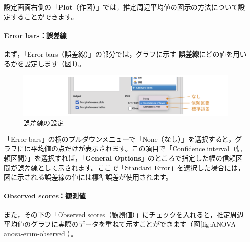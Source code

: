 \documentclass[
  12pt,
  a5jpaper,
  lualatex, ja=standard]{bxjsbook}
\renewcommand{\emph}[1]{\textbf{\color{emph} #1}}
\begin{document}
設定画面右側の「\textbf{Plot}（作図）」では，推定周辺平均値の図示の方法について設定することができます。

\hypertarget{error-barsux8aa4ux5deeux7dda}{%
\paragraph*{Error bars：誤差線}\label{error-barsux8aa4ux5deeux7dda}}

まず，「Error bars（誤差線）」の部分では，グラフに示す\emph{誤差線}にどの値を用いるかを設定します（図\ref{fig:ANOVA-anova-emm-plot-error-bar}）。

\begin{figure}[!ht]

{\centering \includegraphics[width=1\linewidth]{images/ANOVA/anova-emm-plot-error-bar} 

}

\caption{誤差線の設定}\label{fig:ANOVA-anova-emm-plot-error-bar}
\end{figure}

「Error bars」の横のプルダウンメニューで「None（なし）」を選択すると，グラフには平均値の点だけが表示されます。この項目で「Confidence interval（信頼区間）」を選択すれば，「\textbf{General Options}」のところで指定した幅の信頼区間が誤差線として示されます。ここで「Standard Error」を選択した場合には，図に示される誤差線の値には標準誤差が使用されます。

\hypertarget{observed-scoresux89b3ux6e2cux5024}{%
\paragraph*{Observed scores：観測値}\label{observed-scoresux89b3ux6e2cux5024}}

また，その下の「Observed scores（観測値）」にチェックを入れると，推定周辺平均値のグラフに実際のデータを重ねて示すことができます（図\ref{fig:ANOVA-anova-emm-observed}）。
\end{document}
